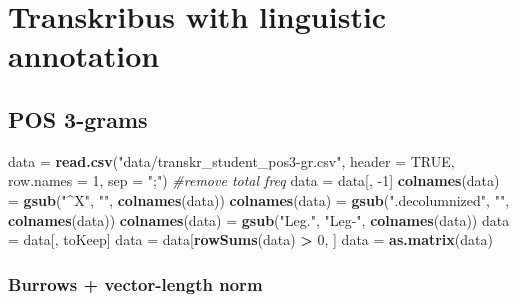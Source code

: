 \documentclass[]{article}
\newenvironment{Shaded}{\begin{snugshade}}{\end{snugshade}}
\newcommand{\CommentTok}[1]{\textcolor[rgb]{0.56,0.35,0.01}{\textit{#1}}}
\newcommand{\DataTypeTok}[1]{\textcolor[rgb]{0.13,0.29,0.53}{#1}}
\newcommand{\DecValTok}[1]{\textcolor[rgb]{0.00,0.00,0.81}{#1}}
\newcommand{\KeywordTok}[1]{\textcolor[rgb]{0.13,0.29,0.53}{\textbf{#1}}}
\newcommand{\NormalTok}[1]{#1}
\newcommand{\OperatorTok}[1]{\textcolor[rgb]{0.81,0.36,0.00}{\textbf{#1}}}
\newcommand{\OtherTok}[1]{\textcolor[rgb]{0.56,0.35,0.01}{#1}}
\newcommand{\StringTok}[1]{\textcolor[rgb]{0.31,0.60,0.02}{#1}}
\begin{document}
\hypertarget{transkribus-with-linguistic-annotation}{%
\section{Transkribus with linguistic
annotation}\label{transkribus-with-linguistic-annotation}}

\hypertarget{pos-3-grams}{%
\subsection{POS 3-grams}\label{pos-3-grams}}

\begin{Shaded}
\begin{Highlighting}[]
\NormalTok{data =}\StringTok{ }\KeywordTok{read.csv}\NormalTok{(}\StringTok{"data/transkr_student_pos3-gr.csv"}\NormalTok{, }\DataTypeTok{header =} \OtherTok{TRUE}\NormalTok{, }\DataTypeTok{row.names =} \DecValTok{1}\NormalTok{, }\DataTypeTok{sep =} \StringTok{";"}\NormalTok{)}
\CommentTok{#remove total freq}
\NormalTok{data =}\StringTok{ }\NormalTok{data[, }\DecValTok{-1}\NormalTok{]}
\KeywordTok{colnames}\NormalTok{(data) =}\StringTok{ }\KeywordTok{gsub}\NormalTok{(}\StringTok{"^X"}\NormalTok{, }\StringTok{""}\NormalTok{, }\KeywordTok{colnames}\NormalTok{(data))}
\KeywordTok{colnames}\NormalTok{(data) =}\StringTok{ }\KeywordTok{gsub}\NormalTok{(}\StringTok{".decolumnized"}\NormalTok{, }\StringTok{""}\NormalTok{, }\KeywordTok{colnames}\NormalTok{(data))}
\KeywordTok{colnames}\NormalTok{(data) =}\StringTok{ }\KeywordTok{gsub}\NormalTok{(}\StringTok{"Leg."}\NormalTok{, }\StringTok{"Leg-"}\NormalTok{, }\KeywordTok{colnames}\NormalTok{(data))}
\NormalTok{data =}\StringTok{ }\NormalTok{data[, toKeep]}
\NormalTok{data =}\StringTok{ }\NormalTok{data[}\KeywordTok{rowSums}\NormalTok{(data) }\OperatorTok{>}\StringTok{ }\DecValTok{0}\NormalTok{, ]}
\NormalTok{data =}\StringTok{ }\KeywordTok{as.matrix}\NormalTok{(data)}
\end{Highlighting}
\end{Shaded}

\hypertarget{burrows-vector-length-norm-4}{%
\subsubsection{Burrows + vector-length
norm}\label{burrows-vector-length-norm-4}}
\end{document}
